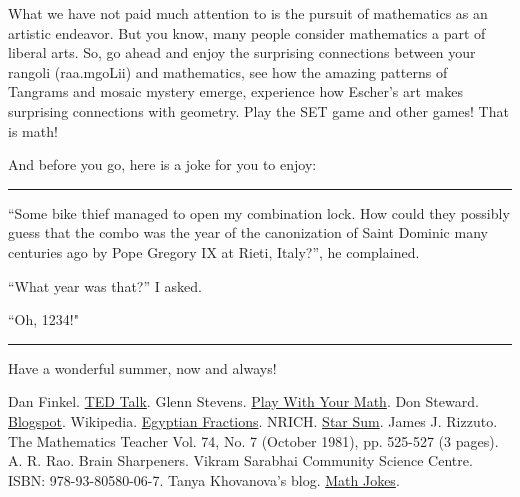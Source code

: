\documentclass[12pt]{exam}         %
\begin{document}
What we have not paid much attention to is the pursuit of mathematics as an artistic endeavor. But you know, many people consider mathematics a part of liberal arts. So, go ahead and enjoy the surprising connections between your rangoli (\textmarathi{raa.mgoLii}) and mathematics, see how the amazing patterns of Tangrams and mosaic mystery emerge, experience how Escher's art makes surprising connections with geometry. Play the SET game and other games! That is math!

And before you go, here is a joke for you to enjoy:

\par\noindent\rule{\textwidth}{0.4pt}
``Some bike thief managed to open my combination lock. How could they possibly guess that the combo was the year of the canonization of Saint Dominic many centuries ago by Pope Gregory IX at Rieti, Italy?'', he complained.

``What year was that?'' I asked.

``Oh, 1234!"

\faSmileO

\par\noindent\rule{\textwidth}{0.4pt}

Have a wonderful summer, now and always!

\newpage
\begin{thebibliography}{00}
     Dan Finkel. \href{https://www.ted.com/talks/dan_finkel_5_ways_to_share_math_with_kids/transcript?language=en}{TED Talk}.
     Glenn Stevens. \href{https://playwithyourmath.com/2020/02/09/24-plus-minus/}{Play With Your Math}.
     Don Steward. \href{https://donsteward.blogspot.com/}{Blogspot}.
     Wikipedia. \href{https://en.wikipedia.org/wiki/Egyptian_fraction}{Egyptian Fractions}.
     NRICH. \href{https://nrich.maths.org/2206}{Star Sum}.
     James J. Rizzuto.  The Mathematics Teacher Vol. 74, No. 7 (October 1981), pp. 525-527 (3 pages).
     A. R. Rao. Brain Sharpeners. Vikram Sarabhai Community Science Centre. ISBN: 978-93-80580-06-7.
     Tanya Khovanova's blog. \href{https://blog.tanyakhovanova.com/category/math-humor/page/2/}{Math Jokes}.
\end{thebibliography}
\end{document}
